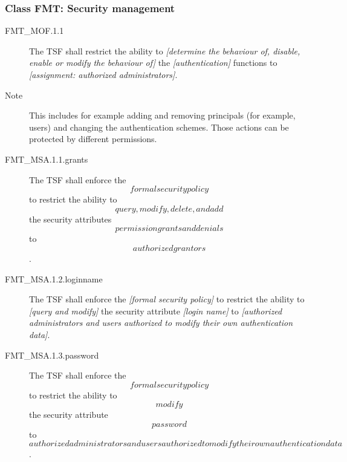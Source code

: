 \documentclass[12pt,english]{scrbook}
\begin{document}



\subsubsection{Class FMT: Security management}





\begin{description}
\item[FMT{\_}MOF.1.1]

The TSF shall restrict the ability to \emph{{[}determine the
behaviour of, disable, enable or modify the behaviour of]} the
\emph{{[}authentication]} functions to \emph{{[}assignment: 
authorized administrators]}.

\item[Note]

This includes for example adding and removing principals (for example,
users) and changing the authentication schemes. Those actions can be
protected by different permissions.

\end{description}






\begin{description}
\item[FMT{\_}MSA.1.1.grants]
    The TSF shall enforce the \emph{\[formal security policy\]} to restrict the
    ability to \emph{\[query, modify, delete, and add\]} the security
    attributes \emph{\[permission grants and denials\]} to \emph{\[authorized
    grantors\]}.

\item[FMT{\_}MSA.1.2.loginname]
    The TSF shall enforce the \emph{{[}formal security policy]} to restrict the
    ability to \emph{{[}query and modify]} the security attribute
    \emph{{[}login name]} to \emph{{[}authorized administrators and users
    authorized to modify their own authentication data]}.

\item[FMT{\_}MSA.1.3.password]
    The TSF shall enforce the \emph{\[formal security policy\]} to restrict
    the ability to \emph{\[modify\]} the security attribute
    \emph{\[password\]} to \emph{\[authorized administrators and users authorized to
    modify their own authentication data\]}.

\end{description}
\end{document}
